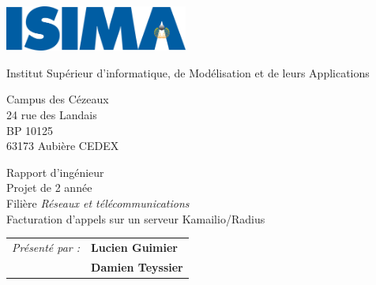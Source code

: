 \thispagestyle{empty}

\includegraphics[width=6cm]{isima.png}

\vspace{0.5cm}

\begin{minipage}{4cm}
\begin{flushleft}
	Institut Supérieur d’informatique, de Modélisation et de leurs Applications
	
	\vspace{0.5cm}
	
	\small{ Campus des Cézeaux \\ 24 rue des Landais \\ BP 10125 \\ 63173 Aubière CEDEX }
\end{flushleft}
\end{minipage}

\vspace{4cm}

\begin{center}
	Rapport d’ingénieur \\
	Projet de 2{\ieme} année \\
	Filière {\em{Réseaux et télécommunications}} \\
	\Large{Facturation d’appels sur un serveur Kamailio/Radius}
\end{center}

\vspace{2cm}

\large{
\begin{tabular}{ll}
\textit{Présenté par :} & \textbf{Lucien Guimier} \\
& \textbf{Damien Teyssier}
\end{tabular}
}

\todo